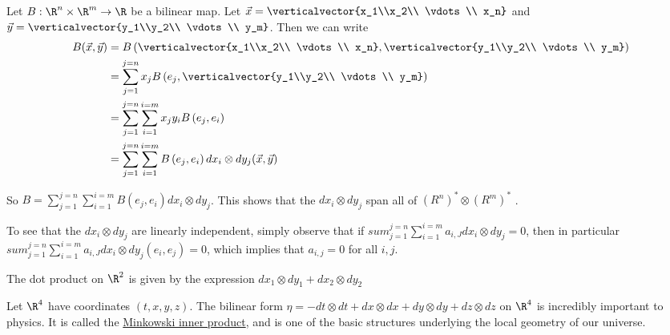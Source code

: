 \documentclass{ximera}
\begin{document}
\begin{free-response}
  Let $B:\R^n \times \R^m \to \R$ be a bilinear map.  Let $\vec{x} = \verticalvector{x_1\\x_2\\ \vdots \\ x_n}$ and 
  $\vec{y} = \verticalvector{y_1\\y_2\\ \vdots \\ y_m}$. Then we can write
  \begin{align*}
    B(\vec{x},\vec{y})&=
    B\left( \verticalvector{x_1\\x_2\\ \vdots \\ x_n}, \verticalvector{y_1\\y_2\\ \vdots \\ y_m}\right) \\
    &= \sum_{j=1}^{j=n} x_jB\left( e_j, \verticalvector{y_1\\y_2\\ \vdots \\ y_m}\right)\\
    &= \sum_{j=1}^{j=n} \sum_{i=1}^{i=m} x_jy_i B\left( e_j , e_i\right)\\
    &= \sum_{j=1}^{j=n} \sum_{i=1}^{i=m} B\left( e_j,e_i\right) dx_i \otimes dy_j(\vec{x},\vec{y})
  \end{align*}
  
  So $B = \sum_{j=1}^{j=n} \sum_{i=1}^{i=m} B\left( e_j,e_i\right) dx_i \otimes dy_j$.  This shows that the $dx_i \otimes dy_j$ span all of 
  $\left(R^n\right)^* \otimes \left(R^m\right)^*$ .
  
  To see that the $dx_i \otimes dy_j$ are linearly independent, simply observe that if 
  $sum_{j=1}^{j=n} \sum_{i=1}^{i=m} a_{i,J} dx_i \otimes dy_j = 0$, then in particular
  $sum_{j=1}^{j=n} \sum_{i=1}^{i=m} a_{i,J} dx_i \otimes dy_j (e_i,e_j)= 0$, which implies that
  $a_{i,j} = 0$ for all $i,j$.
\end{free-response}

\begin{example}
  The dot product on $\R^2$ is given by the expression $dx_1 \otimes dy_1 + dx_2 \otimes dy_2$
\end{example}

\begin{example}
  Let $\R^4$ have coordinates $(t,x,y,z)$.  The bilinear form $\eta = -dt \otimes dt +dx \otimes dx + dy\otimes dy + dz \otimes dz $ on $\R^4$ is incredibly important to physics.  
  It is called the \href{http://en.wikipedia.org/wiki/Minkowski_space}{Minkowski inner product}, and is one of the basic structures underlying the local geometry of our 
  universe.
\end{example}


	
	
	
	
	
\end{document}
